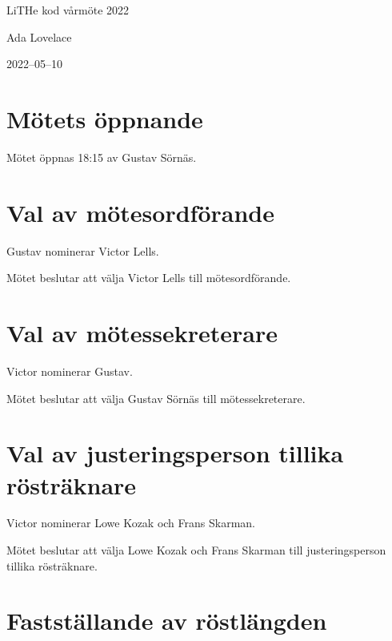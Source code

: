\documentclass[a4paper]{article}
\begin{document}
\pagestyle{fancy}

\setlength{\headheight}{50pt}

\begin{center}
{\huge LiTHe kod vårmöte 2022}\par
\vspace{0.5em}
{\Large Ada Lovelace}\par
{2022--05--10}
\vspace{1.5em}
\end{center}

\section{Mötets öppnande}

Mötet öppnas 18:15 av Gustav Sörnäs.

\section{Val av mötesordförande}

Gustav nominerar Victor Lells.

Mötet beslutar att välja Victor Lells till mötesordförande.

\section{Val av mötessekreterare}

Victor nominerar Gustav.

Mötet beslutar att välja Gustav Sörnäs till mötessekreterare.

\section{Val av justeringsperson tillika rösträknare}

Victor nominerar Lowe Kozak och Frans Skarman.

Mötet beslutar att välja Lowe Kozak och Frans Skarman till justeringsperson tillika
rösträknare.

\section{Fastställande av röstlängden}
\end{document}
